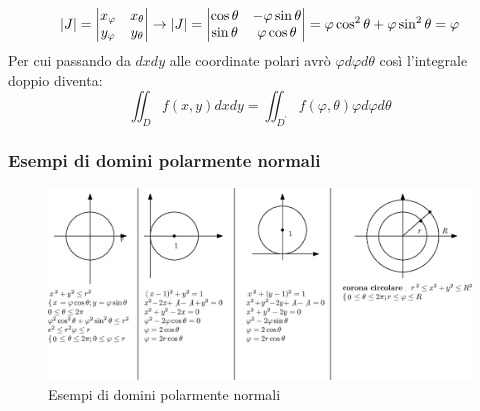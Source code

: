 \begin{itemize}
\begin{equation}
     \lvert J\rvert=\begin{vmatrix}
               x_\varphi & x_\theta\\
               y_\varphi & y_\theta
             \end{vmatrix}
             \to \lvert J\rvert=\begin{vmatrix}
                           \cos \theta & -\varphi \sin \theta\\
                           \sin \theta & \varphi \cos \theta
                         \end{vmatrix}
                         =\varphi\cos^2\theta+\varphi \sin^2\theta =\varphi
   \end{equation} 
   Per cui passando da $dxdy$ alle coordinate polari avrò $\varphi d\varphi d\theta$ così
   l'integrale doppio diventa:
   \begin{equation*}
     \iint_Df(x,y)dxdy=\iint_{D^\prime}f(\varphi,\theta)\varphi d\varphi d\theta
   \end{equation*}
\end{itemize}
\clearpage
\subsubsection{Esempi di domini polarmente normali}
\begin{figure}[ht]
  \centering
  \includegraphics[width=14cm]{img/finiti/esdompolnorm.eps}
  \caption{Esempi di domini polarmente normali}
\end{figure}
